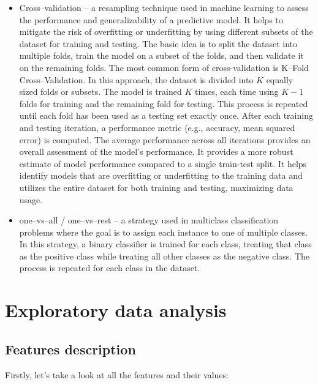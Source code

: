 \documentclass[11pt,a4paper]{article}\usepackage[]{graphicx}\usepackage[]{xcolor}
\begin{document}
\begin{itemize}
\item Cross--validation -- a resampling technique used in machine learning to assess the performance and generalizability of a predictive model. It helps to mitigate the risk of overfitting or underfitting by using different subsets of the dataset for training and testing. The basic idea is to split the dataset into multiple folds, train the model on a subset of the folds, and then validate it on the remaining folds. The most common form of cross-validation is K--Fold Cross--Validation. In this approach, the dataset is divided into $K$ equally sized folds or subsets.
The model is trained $K$ times, each time using $K-1$ folds for training and the remaining fold for testing. This process is repeated until each fold has been used as a testing set exactly once. After each training and testing iteration, a performance metric (e.g., accuracy, mean squared error) is computed. The average performance across all iterations provides an overall assessment of the model's performance. It provides a more robust estimate of model performance compared to a single train-test split. It helps identify models that are overfitting or underfitting to the training data and utilizes the entire dataset for both training and testing, maximizing data usage.


\item one--vs--all / one--vs--rest -- a strategy used in multiclass classification problems where the goal is to assign each instance to one of multiple classes. In this strategy, a binary classifier is trained for each class, treating that class as the positive class while treating all other classes as the negative class. The process is repeated for each class in the dataset.


	
	\end{itemize}
	
	
	\section{Exploratory data analysis}
	
	\subsection{Features description}
	
	Firstly, let's take a look at all the features and their values:
	
\end{document}
